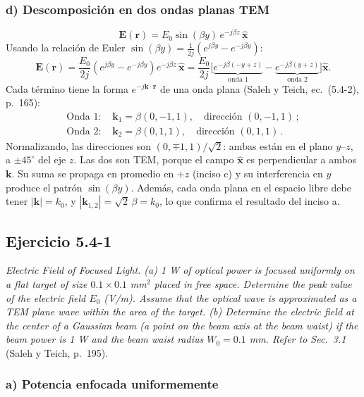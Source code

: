 \documentclass{article}
\newcommand{\xh}{\hat{\mathbf{x}}}
\begin{document}
\subsubsection*{d) Descomposición en dos ondas planas TEM}

\[
\mathbf E(\mathbf r)=E_0\sin(\beta y)\,e^{-j\beta z}\,\xh
\]
Usando la relación de Euler $\sin(\beta y)=\frac{1}{2j}\left(e^{j\beta y}-e^{-j\beta y}\right)$:
\[
\mathbf E(\mathbf r)=\frac{E_0}{2j}\left(e^{j\beta y}-e^{-j\beta y}\right)e^{-j\beta z}\,\xh
=\frac{E_0}{2j}\Big[\underbrace{e^{-j\beta(-y+z)}}_{\text{onda 1}}-\underbrace{e^{-j\beta(y+z)}}_{\text{onda 2}}\Big]\xh .
\]
Cada término tiene la forma $e^{-j\mathbf k\cdot\mathbf r}$ de una onda plana (Saleh y Teich, ec.~(5.4-2), p.~165):
\begin{align*}
\text{Onda 1: }&\mathbf k_1=\beta(0,-1,1),\quad\text{dirección }\boxed{(0,-1,1)}\,;\\
\text{Onda 2: }&\mathbf k_2=\beta(0,1,1),\quad\text{dirección }\boxed{(0,1,1)}\,.
\end{align*}
Normalizando, las direcciones son $(0,\mp1,1)/\sqrt2$: ambas están en el plano $y$--$z$, a $\pm45^\circ$
del eje $z$. Las dos son TEM, porque el campo $\xh$ es perpendicular a ambos $\mathbf k$. Su suma se
propaga en promedio en $+z$ (inciso c) y su interferencia en $y$ produce el patrón $\sin(\beta y)$.
Además, cada onda plana en el espacio libre debe tener $|\mathbf k|=k_0$, y
$|\mathbf k_{1,2}|=\sqrt2\,\beta=k_0$, lo que confirma el resultado del inciso a.

\subsection{Ejercicio 5.4-1}

\emph{Electric Field of Focused Light. (a) 1 W of optical power is focused uniformly on a flat target of
size $0.1\times0.1$ mm$^2$ placed in free space. Determine the peak value of the electric field $E_0$
(V/m). Assume that the optical wave is approximated as a TEM plane wave within the area of the target.
(b) Determine the electric field at the center of a Gaussian beam (a point on the beam axis at the beam
waist) if the beam power is 1 W and the beam waist radius $W_0=0.1$ mm. Refer to Sec.~3.1}
(Saleh y Teich, p.~195).

\subsubsection*{a) Potencia enfocada uniformemente}
\end{document}

